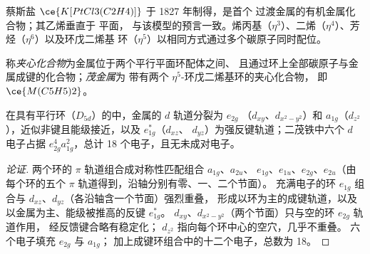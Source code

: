 蔡斯盐 $\ce{K[PtCl3(C2H4)]}$ 于 1827 年制得，是首个
过渡金属的有机金属化合物；其乙烯垂直于  平面，
与该模型的预言一致。烯丙基（$\eta^3$）、二烯（$\eta^4$）、芳烃（$\eta^6$）以及环戊二烯基
环（$\eta^5$）以相同方式通过多个碳原子同时配位。

\begin{definition}[茂金属]\label{def:b3:organometallic-bonding:metallocene}
称\emph{夹心化合物}为金属位于两个平行平面环配体之间、
且通过环上全部碳原子与金属成键的化合物；\emph{茂金属}为
带有两个 $\eta^5$-环戊二烯基环的夹心化合物，
即 $\ce{M(C5H5)2}$。
\end{definition}

\begin{proposition}[二茂铁的前线轨道]\label{prop:b3:organometallic-bonding:ferrocene}
在具有平行环（$D_{5d}$）的中，金属的 $d$ 轨道分裂为 $e_{2g}$
（$d_{xy}$、$d_{x^2-y^2}$）和 $a_{1g}$（$d_{z^2}$），近似非键且能级接近，以及 $e_{1g}^\ast$（$d_{xz}$、
$d_{yz}$）为强反键轨道；二茂铁中六个 $d$ 电子占据 $e_{2g}^4a_{1g}^2$，总计 18
个电子，且无未成对电子。
\end{proposition}

\begin{proof}[论证]
两个环的 $\pi$ 轨道组合成对称性匹配组合 $a_{1g}$、$a_{2u}$、
$e_{1g}$、$e_{1u}$、$e_{2g}$、$e_{2u}$（由每个环的五个 $\pi$ 轨道得到，沿轴分别有零、一、二个节面）。
充满电子的环 $e_{1g}$ 组合与 $d_{xz}$、$d_{yz}$（各沿轴含一个节面）强烈重叠，
形成以环为主的成键轨道，以及以金属为主、能级被推高的反键 $e_{1g}^\ast$。
$d_{xy}$、$d_{x^2-y^2}$（两个节面）只与空的环 $e_{2g}$ 轨道作用，
经反馈键合略有稳定化；
$d_{z^2}$ 指向每个环中心的空穴，几乎不重叠。
六个电子填充 $e_{2g}$ 与 $a_{1g}$；
加上成键环组合中的十二个电子，总数为 18。
\end{proof}

